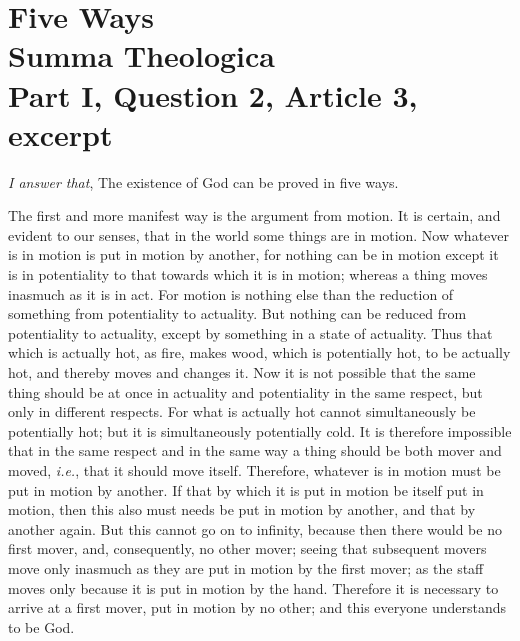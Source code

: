 
\author{Thomas Aquinas}
\chapter[Thomas Aquinas -- Five Ways]{Five Ways\\\smaller Summa
Theologica\\\smaller Part I, Question 2, Article 3, excerpt}


\textit{I answer that}, The existence of God can be proved in
five ways.

The first and more manifest way is the argument from motion. It is
certain, and evident to our senses, that in the world some things are
in motion. Now whatever is in motion is put in motion by another, for
nothing can be in motion except it is in potentiality to that towards
which it is in motion; whereas a thing moves inasmuch as it is in act.
For motion is nothing else than the reduction of something from
potentiality to actuality. But nothing can be reduced from
potentiality to actuality, except by something in a state of
actuality. Thus that which is actually hot, as fire, makes wood, which
is potentially hot, to be actually hot, and thereby moves and changes
it. Now it is not possible that the same thing should be at once in
actuality and potentiality in the same  respect, but only in
different respects. For what is actually hot cannot simultaneously be
potentially hot; but it is simultaneously potentially cold. It is
therefore impossible that in the same respect and in the same way a
thing should be both mover and moved, \textit{i.e.}, that it should
move itself. Therefore, whatever is in motion must be put in motion by
another. If that by which it is put in motion be itself put in motion,
then this also must needs be put in motion by another, and that by
another again. But this cannot go on to infinity, because then there
would be no first mover, and, consequently, no other mover; seeing
that subsequent movers move only inasmuch as they are put in motion by
the first mover; as the staff moves only because it is put in motion
by the hand. Therefore it is necessary to arrive at a first mover, put
in motion by no other; and this everyone understands to be God.


